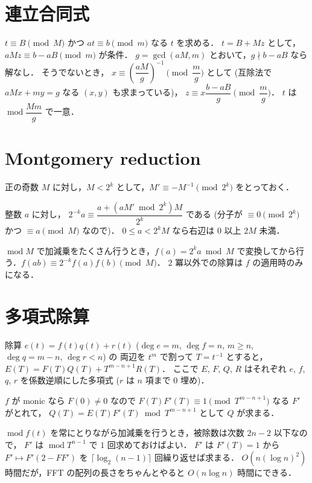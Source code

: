 \documentclass{jsarticle}
\DeclareMathOperator{\Mod}{mod}
\begin{document}
\section{連立合同式}
$t \equiv B \pmod{M}$ かつ $a t \equiv b \pmod{m}$ なる $t$ を求める．
$t = B + M z$ として，$a M z \equiv b - a B \pmod{m}$ が条件．
$g = \gcd(a M, m)$ とおいて，$g \nmid b - a B$ なら解なし．
そうでないとき，
$x \equiv \left( \dfrac{a M}{g} \right)^{-1} \pmod{\dfrac{m}{g}}$ として (互除法で $a M x + m y = g$ なる $(x, y)$ も求まっている)，
$z \equiv x \dfrac{b - a B}{g} \pmod{\dfrac{m}{g}}$．
$t$ は $\Mod \dfrac{M m}{g}$ で一意．


\section{Montgomery reduction}
正の奇数 $M$ に対し，$M < 2^k$ として，$M' \equiv -M^{-1} \pmod{2^k}$ をとっておく．

整数 $a$ に対し，
$2^{-k} a \equiv \dfrac{a + (a M' \bmod 2^k) M}{2^k}$ である (分子が $\equiv 0 \pmod{2^k}$ かつ $\equiv a \pmod{M}$ なので)．
$0 \le a < 2^k M$ なら右辺は $0$ 以上 $2 M$ 未満．

$\Mod M$ で加減乗をたくさん行うとき，$f(a) = 2^k a \bmod M$ で変換してから行う．$f(a b) \equiv 2^{-k} f(a) f(b) \pmod{M}$．
$2$ 冪以外での除算は $f$ の適用時のみになる．


\section{多項式除算}
除算 $e(t) = f(t) q(t) + r(t)$ ($\deg e = m$, $\deg f = n$, $m \ge n$, $\deg q = m - n$, $\deg r < n$) の
両辺を $t^m$ で割って $T = t^{-1}$ とすると，
$E(T) = F(T) Q(T) + T^{m-n+1} R(T)$．
ここで $E$, $F$, $Q$, $R$ はそれぞれ $e$, $f$, $q$, $r$ を係数逆順にした多項式 ($r$ は $n$ 項まで $0$ 埋め)．

$f$ が monic なら $F(0) \ne 0$ なので $F(T) F'(T) \equiv 1 \pmod{T^{m-n+1}}$ なる $F'$ がとれて，
$Q(T) = E(T) F'(T) \bmod T^{m-n+1}$ として $Q$ が求まる．

$\Mod f(t)$ を常にとりながら加減乗を行うとき，被除数は次数 $2 n - 2$ 以下なので，
$F'$ は $\Mod T^{n-1}$ で $1$ 回求めておけばよい．
$F'$ は $F'(T) = 1$ から $F' \mapsto F' (2 - F F')$ を $\lceil \log_2 (n - 1) \rceil$ 回繰り返せば求まる．
$O(n (\log n)^2)$ 時間だが，FFT の配列の長さをちゃんとやると $O(n \log n)$ 時間にできる．
\end{document}
